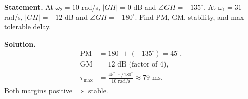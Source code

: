 \documentclass[11pt]{article}
\begin{document}
\textbf{Statement.} At $\omega_2=10$ rad/s, $|GH|=0$ dB and $\angle GH = -135^\circ$. At $\omega_1 = 31$ rad/s, $|GH|=-12$ dB and $\angle GH = -180^\circ$. Find PM, GM, stability, and max tolerable delay.

\textbf{Solution.}
\begin{align*}
\text{PM} &= 180^\circ + (-135^\circ) = 45^\circ,\\
\text{GM} &= 12\text{ dB (factor of 4)},\\
\tau_\text{max} &= \frac{45^\circ \cdot \pi/180^\circ}{10\text{ rad/s}} \approx 79\text{ ms}.
\end{align*}
Both margins positive $\Rightarrow$ stable.
\end{document}
